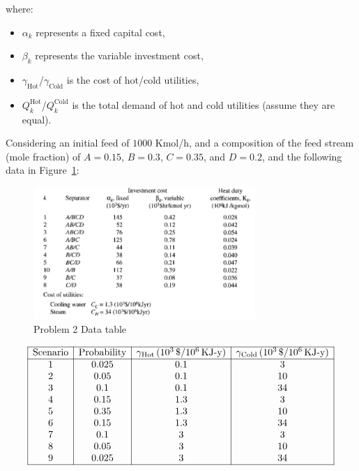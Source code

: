\documentclass[11pt]{article}
\begin{document}
where:
\begin{itemize}
    \item $\alpha_k$ represents a fixed capital cost,
    \item $\beta_k$ represents the variable investment cost,
    \item $\gamma_{\text{Hot}}$/$\gamma_{\text{Cold}}$ is the cost of hot/cold utilities,
    \item $Q_k^{\text{Hot}}$/$Q_k^{\text{Cold}}$ is the total demand of hot and cold utilities (assume they are equal).
\end{itemize}

Considering an initial feed of $1000$ Kmol/h, and a composition of the feed stream (mole fraction) of $A=0.15$, $B=0.3$, $C=0.35$, and $D=0.2$, and the following data in Figure~\ref{fig:prob2_table}:

\begin{figure}[htbp]
  \centerline{\includegraphics[width=0.75\textwidth]{images/prob2_table.png}}
  \caption{Problem 2 Data table}
  \label{fig:prob2_table}
\end{figure}

\[
\begin{array}{|c|c|c|c|c|}
\hline
\text{Scenario} & \text{Probability} & \gamma_{\text{Hot}} \, (10^3 \, \$/10^6 \, \text{KJ-y}) & \gamma_{\text{Cold}} \, (10^3 \, \$/10^6 \, \text{KJ-y}) \\
\hline
1 & 0.025 & 0.1 & 3 \\
2 & 0.05 & 0.1 & 10 \\
3 & 0.1 & 0.1 & 34 \\
4 & 0.15 & 1.3 & 3 \\
5 & 0.35 & 1.3 & 10 \\
6 & 0.15 & 1.3 & 34 \\
7 & 0.1 & 3 & 3 \\
8 & 0.05 & 3 & 10 \\
9 & 0.025 & 3 & 34 \\
\hline
\end{array}
\]
\end{document}
